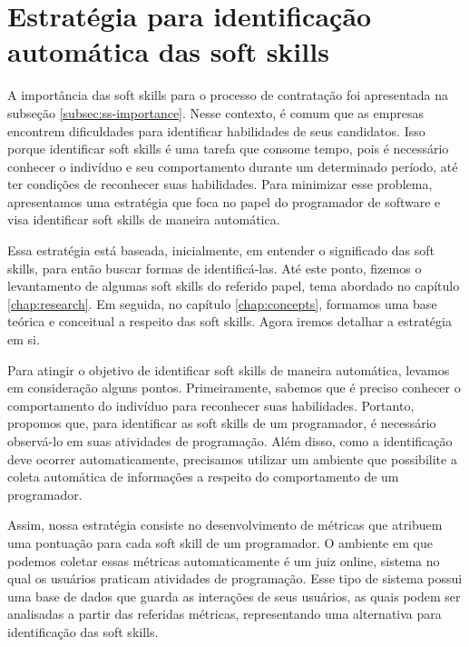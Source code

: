 

\chapter{Estratégia para identificação automática das soft skills}

\label{chap:metrics}

A importância das soft skills para o processo de contratação foi apresentada na subseção \ref{subsec:ss-importance}. Nesse contexto, é comum que as empresas encontrem dificuldades para identificar habilidades de seus candidatos. Isso porque identificar soft skills é uma tarefa que consome tempo, pois é necessário conhecer o indivíduo e seu comportamento durante um determinado período, até ter condições de reconhecer suas habilidades. Para minimizar esse problema, apresentamos uma estratégia que foca no papel do programador de software e visa identificar soft skills de maneira automática.


Essa estratégia está baseada, inicialmente, em entender o significado das soft skills, para então buscar formas de identificá-las.
Até este ponto, fizemos o levantamento de algumas soft skills do referido papel, tema abordado no capítulo \ref{chap:research}. Em seguida, no capítulo \ref{chap:concepts}, formamos uma base teórica e conceitual a respeito das soft skills.
Agora iremos detalhar a estratégia em si.

Para atingir o objetivo de identificar soft skills de maneira automática, levamos em consideração alguns pontos. Primeiramente, sabemos que é preciso conhecer o comportamento do indivíduo para reconhecer suas habilidades. Portanto, propomos que, para identificar as soft skills de um programador, é necessário observá-lo em suas atividades de programação. Além disso, como a identificação deve ocorrer automaticamente, precisamos utilizar um ambiente que possibilite a coleta automática de informações a respeito do comportamento de um programador.

Assim, nossa estratégia consiste no desenvolvimento de métricas que atribuem uma pontuação para cada soft skill de um programador. O ambiente em que podemos coletar essas métricas automaticamente é um juiz online, sistema no qual os usuários praticam atividades de programação. Esse tipo de sistema possui uma base de dados que guarda as interações de seus usuários, as quais podem ser analisadas a partir das referidas métricas, representando uma alternativa para identificação das soft skills.

